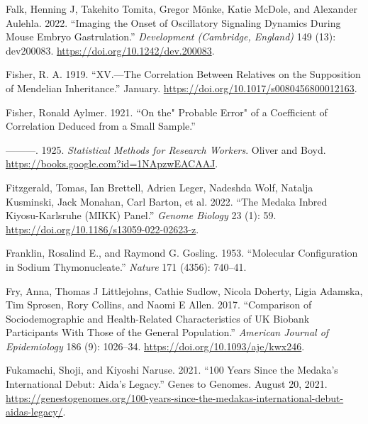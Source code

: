 \documentclass[
]{book}
\newlength{\cslhangindent}
\newlength{\cslentryspacingunit} %
\newenvironment{CSLReferences}[2] %
 {%
  \setlength{\parindent}{0pt}
  \ifodd #1
  \let\oldpar\par
  \def\par{\hangindent=\cslhangindent\oldpar}
  \fi
  \setlength{\parskip}{#2\cslentryspacingunit}
 }%
 {}
\begin{document}
\begin{CSLReferences}{1}{0}
\leavevmode{}%
Falk, Henning J, Takehito Tomita, Gregor Mönke, Katie McDole, and Alexander Aulehla. 2022. {``Imaging the Onset of Oscillatory Signaling Dynamics During Mouse Embryo Gastrulation.''} \emph{Development (Cambridge, England)} 149 (13): dev200083. \url{https://doi.org/10.1242/dev.200083}.

\leavevmode{}%
Fisher, R. A. 1919. {``{XV}.---{The Correlation} Between {Relatives} on the {Supposition} of {Mendelian Inheritance}.''} January. \url{https://doi.org/10.1017/s0080456800012163}.

\leavevmode{}%
Fisher, Ronald Aylmer. 1921. {``On the{"} {Probable Error}{"} of a {Coefficient} of {Correlation Deduced} from a {Small Sample}.''}

\leavevmode{}%
---------. 1925. \emph{Statistical {Methods} for {Research Workers}}. {Oliver and Boyd}. \url{https://books.google.com?id=1NApzwEACAAJ}.

\leavevmode{}%
Fitzgerald, Tomas, Ian Brettell, Adrien Leger, Nadeshda Wolf, Natalja Kusminski, Jack Monahan, Carl Barton, et al. 2022. {``The {Medaka Inbred Kiyosu-Karlsruhe} ({MIKK}) Panel.''} \emph{Genome Biology} 23 (1): 59. \url{https://doi.org/10.1186/s13059-022-02623-z}.

\leavevmode{}%
Franklin, Rosalind E., and Raymond G. Gosling. 1953. {``Molecular Configuration in Sodium Thymonucleate.''} \emph{Nature} 171 (4356): 740--41.

\leavevmode{}%
Fry, Anna, Thomas J Littlejohns, Cathie Sudlow, Nicola Doherty, Ligia Adamska, Tim Sprosen, Rory Collins, and Naomi E Allen. 2017. {``Comparison of {Sociodemographic} and {Health-Related Characteristics} of {UK Biobank Participants With Those} of the {General Population}.''} \emph{American Journal of Epidemiology} 186 (9): 1026--34. \url{https://doi.org/10.1093/aje/kwx246}.

\leavevmode{}%
Fukamachi, Shoji, and Kiyoshi Naruse. 2021. {``100 Years Since the Medaka's International Debut: {Aida}'s Legacy.''} {Genes to Genomes}. August 20, 2021. \url{https://genestogenomes.org/100-years-since-the-medakas-international-debut-aidas-legacy/}.


\end{CSLReferences}
\end{document}
